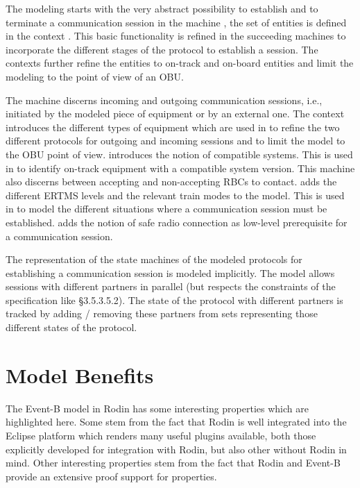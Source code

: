 \documentclass{template/openetcs_article}
\begin{document}
The modeling starts with the very abstract possibility to establish and to
terminate a communication session in the machine , the set of
entities is defined in the context . This basic functionality is
refined in the succeeding machines to incorporate the different stages of the
protocol to establish a session. The contexts further refine the entities to
on-track and on-board entities and limit the modeling to the point of view of an
OBU.

The machine  discerns incoming and outgoing communication sessions,
i.e., initiated by the modeled piece of equipment or by an external one. The
context  introduces the different types of equipment which are used in
 to refine the two different protocols for outgoing and incoming
sessions and to limit the model to the OBU point of view.  introduces
the notion of compatible systems. This is used in  to identify
on-track equipment with a compatible system version. This machine also discerns
between accepting and non-accepting RBCs to contact.  adds the
different ERTMS levels and the relevant train modes to the model. This is used
in  to model the different situations where a communication session
must be established.  adds the notion of safe radio connection as
low-level prerequisite for a communication session.

The representation of the state machines of the modeled protocols for
establishing a communication session is modeled implicitly. The model allows
sessions with different partners in parallel (but respects the constraints of
the specification like §3.5.3.5.2). The state of the protocol with different
partners is tracked by adding / removing these partners from sets representing
those different states of the protocol.

\section{Model Benefits}
\label{sec:model-highlights}

The Event-B model in Rodin has some interesting properties which are highlighted
here. Some stem from the fact that Rodin is well integrated into the Eclipse
platform which renders many useful plugins available, both those explicitly
developed for integration with Rodin, but also other without Rodin in mind.
Other interesting properties stem from the fact that Rodin and Event-B provide
an extensive proof support for properties.
\end{document}
